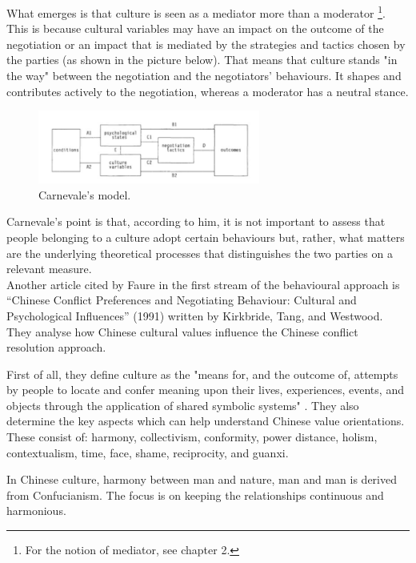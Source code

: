 \documentclass[../main.tex]{subfiles}
\begin{document}
What emerges is that culture is seen as a mediator more than a moderator \autocite[321]{carnevale}\footnote{For the notion of mediator, see chapter 2.}. This is because cultural variables may have an impact on the outcome of the negotiation or an impact that is mediated by the strategies and tactics chosen by the parties (as shown in the picture below). That means that culture stands "in the way" between the negotiation and the negotiators' behaviours. It shapes and contributes actively to the negotiation, whereas a moderator has a neutral stance.

\begin{figure}[h]
    \centering\includegraphics[width=0.65\textwidth]{images/carnevale.jpg}
    \caption{Carnevale's model.}
\end{figure}

Carnevale's point is that, according to him, it is not important to assess that people belonging to a culture adopt certain behaviours but, rather, what matters are the underlying theoretical processes that distinguishes the two parties on a relevant measure.\\

Another article cited by Faure in the first stream of the behavioural approach is “Chinese Conflict Preferences and Negotiating Behaviour: Cultural and Psychological Influences” (1991) written by Kirkbride, Tang, and Westwood. They analyse how Chinese cultural values influence the Chinese conflict resolution approach.

First of all, they define culture as the "means for, and the outcome of, attempts by people to locate and confer meaning upon their lives, experiences, events, and objects through the application of shared symbolic systems" \autocite[366]{tang}. They also determine the key aspects which can help understand Chinese value orientations. These consist of: harmony, collectivism, conformity, power distance, holism, contextualism, time, face, shame, reciprocity, and guanxi.

In Chinese culture, harmony between man and nature, man and man is derived from Confucianism. The focus is on keeping the relationships continuous and harmonious. 
\end{document}
